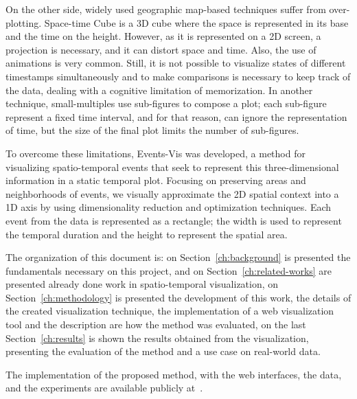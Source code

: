 %
On the other side, widely used geographic map-based techniques suffer from over-plotting. 
%
Space-time Cube is a 3D cube where the space is represented in its base and the time on the height. However, as it is represented on a 2D screen, a projection is necessary, and it can distort space and time.
%
Also, the use of animations is very common. Still, it is not possible to visualize states of different timestamps simultaneously and to make comparisons is necessary to keep track of the data, dealing with a cognitive limitation of memorization.
%
In another technique, small-multiples use sub-figures to compose a plot; each sub-figure represent a fixed time interval, and for that reason, can ignore the representation of time, but the size of the final plot limits the number of sub-figures.
%

To overcome these limitations, Events-Vis was developed, a method for visualizing spatio-temporal events that seek to represent this three-dimensional information in a static temporal plot.
%
Focusing on preserving areas and neighborhoods of events, we visually approximate the 2D spatial context into a 1D axis by using dimensionality reduction and optimization techniques. 
%
Each event from the data is represented as a rectangle; the width is used to represent the temporal duration and the height to represent the spatial area.

The organization of this document is: on Section~\ref{ch:background} is presented the fundamentals necessary on this project, and on Section~\ref{ch:related-works} are presented already done work in spatio-temporal visualization, on Section~\ref{ch:methodology} is presented the development of this work, the details of the created visualization technique, the implementation of a web visualization tool and the description are how the method was evaluated, on the last Section~\ref{ch:results} is shown the results obtained from the visualization, presenting the evaluation of the method and a use case on real-world data.

The implementation of the proposed method, with the web interfaces, the data, and the experiments are available publicly at~\cite{Giovani2021}.